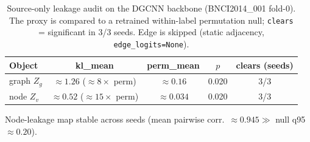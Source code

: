 \begin{table}[t]
\centering
\caption{Source-only leakage audit on the DGCNN backbone (BNCI2014\_001 fold-0). The proxy is compared to a
retrained within-label permutation null; \texttt{clears} = significant in 3/3 seeds. Edge is skipped
(static adjacency, \texttt{edge\_logits=None}).}
\label{tab:leakage_audit}
\small
\begin{tabular}{lcccc}
\toprule
Object & kl\_mean & perm\_mean & $p$ & clears (seeds) \\
\midrule
graph $Z_g$ & $\approx 1.26$ ($\approx 8\times$ perm)  & $\approx 0.16$  & 0.020 & 3/3 \\
node $Z_v$  & $\approx 0.52$ ($\approx 15\times$ perm) & $\approx 0.034$ & 0.020 & 3/3 \\
\bottomrule
\end{tabular}

\vspace{2pt}
\footnotesize Node-leakage map stable across seeds (mean pairwise corr.\ $\approx 0.945 \gg$ null q95 $\approx 0.20$).
\end{table}
